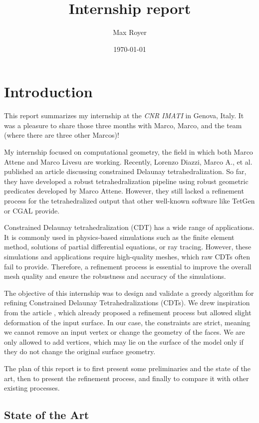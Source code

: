 \documentclass[11pt]{article}
\title{Internship report}
\author{Max Royer}
\date{\today}
\begin{document}


\tableofcontents

\newpage

\section{Introduction}

This report summarizes my internship at the \emph{CNR IMATI} in Genova, Italy. It was a pleasure to share those three months with Marco, Marco, and the team (where there are three other Marcos)!

My internship focused on computational geometry, the field in which both Marco Attene and Marco Livesu are
working. Recently, Lorenzo Diazzi, Marco A., et al. published an article \cite{diazzi:cdt} discussing constrained Delaunay tetrahedralization. So far, they have developed a robust tetrahedralization pipeline using robust geometric predicates developed by Marco Attene. However, they still lacked a refinement process for the tetrahedralized output that other well-known software like TetGen \cite{si:tetgen} or CGAL \cite{cgal:eb24b} provide.

Constrained Delaunay tetrahedralization (CDT) has a wide range of applications. It is commonly used in
physics-based simulations such as the finite element method, solutions of partial differential equations, or
ray tracing. However, these simulations and applications require high-quality meshes, which raw CDTs often
fail to provide. Therefore, a refinement process is essential to improve the overall mesh quality and ensure
the robustness and accuracy of the simulations.

The objective of this internship was to design and validate a greedy algorithm for refining Constrained Delaunay Tetrahedralizations (CDTs). We drew inspiration from the article \cite{hu:tetwild}, which already proposed a refinement process but allowed slight deformation of the input surface. In our case, the constraints are strict, meaning we cannot remove an input vertex or change the geometry of the faces. We are only allowed to add vertices, which may lie on the surface of the model only if they do not change the original surface geometry.

The plan of this report is to first present some preliminaries and the state of the art, then to present the refinement process, and finally to compare it with other existing processes.

\subsection*{State of the Art}
\end{document}
